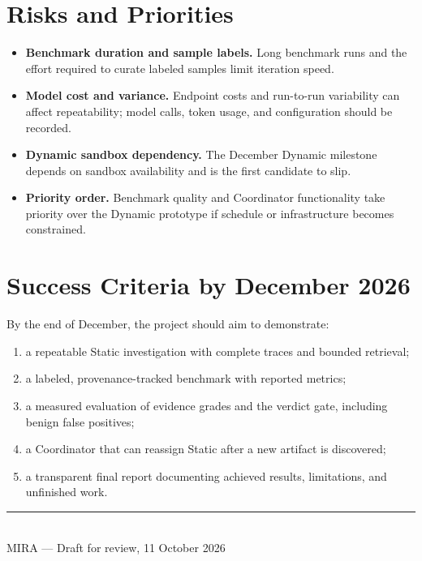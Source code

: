 \documentclass[11pt,a4paper]{article}
\begin{document}
\section{Risks and Priorities}

\begin{itemize}
  \item \textbf{Benchmark duration and sample labels.} Long benchmark runs and the effort required to curate labeled samples limit iteration speed.
  \item \textbf{Model cost and variance.} Endpoint costs and run-to-run variability can affect repeatability; model calls, token usage, and configuration should be recorded.
  \item \textbf{Dynamic sandbox dependency.} The December Dynamic milestone depends on sandbox availability and is the first candidate to slip.
  \item \textbf{Priority order.} Benchmark quality and Coordinator functionality take priority over the Dynamic prototype if schedule or infrastructure becomes constrained.
\end{itemize}

\section{Success Criteria by December 2026}

By the end of December, the project should aim to demonstrate:
\begin{enumerate}
  \item a repeatable Static investigation with complete traces and bounded retrieval;
  \item a labeled, provenance-tracked benchmark with reported metrics;
  \item a measured evaluation of evidence grades and the verdict gate, including benign false positives;
  \item a Coordinator that can reassign Static after a new artifact is discovered;
  \item a transparent final report documenting achieved results, limitations, and unfinished work.
\end{enumerate}

\vfill
\begin{center}
\color{mirateal}\rule{0.45\textwidth}{0.8pt}\\[0.4em]
{\small\textcolor{muted}{MIRA --- Draft for review, 11 October 2026}}
\end{center}
\end{document}
